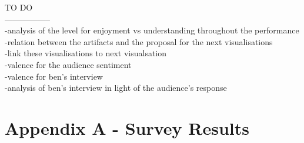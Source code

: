 \documentclass[12pt]{article}
\begin{document}
TO DO\\
-----------------\\

-analysis of the level for enjoyment vs understanding throughout the performance\\
-relation between the artifacts and the proposal for the next visualisations\\
-link these visualisations to next visualsation\\
-valence for the audience sentiment\\
-valence for ben's interview\\
-analysis of ben's interview in light of the audience's response\\




\newpage
\section*{Appendix A - Survey Results}
\end{document}
